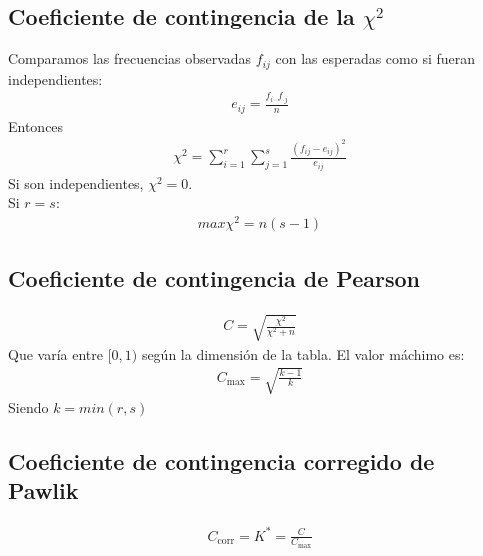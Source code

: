 \documentclass{article}
\begin{document}
\subsection{Coeficiente de contingencia de la $\chi^{2}$}
Comparamos las frecuencias observadas $f_{ij}$ con las esperadas como
si fueran independientes:
\begin{equation}
    \begin{split}
        e_{ij} = \frac{f_{i\cdot } f_{\cdot j}}{n}
    \end{split}
\end{equation}
Entonces
\begin{equation}
    \begin{split}
        \chi^{2}= \sum _{i=1}^r \sum _{j=1}^{s} \frac{(f_{ij}-e_{ij})^{2}}{e_{ij}}
    \end{split}
\end{equation}
Si son independientes, $\chi^{2}=0$.\\
Si $r=s$:
\begin{equation}
    \begin{split}
        max \chi^{2}=n(s-1)
    \end{split}
\end{equation}
\subsection{Coeficiente de contingencia de Pearson}
\begin{equation}
    \begin{split}
        C = \sqrt{\frac{\chi^{2}}{\chi^{2}+n}}
    \end{split}
\end{equation}
Que varía entre $[0,1)$ según la dimensión de la tabla. El valor máchimo es:
\begin{equation}
    \begin{split}
        C_{\text{max}}= \sqrt{\frac{k-1}{k}}
    \end{split}
\end{equation}
Siendo $k=min(r,s)$
\subsection{Coeficiente de contingencia corregido de Pawlik}
\begin{equation}
    \begin{split}
        C_{\text{corr}}= K^* = \frac{C}{C_{\text{max}}}
    \end{split}
\end{equation}
\end{document}
